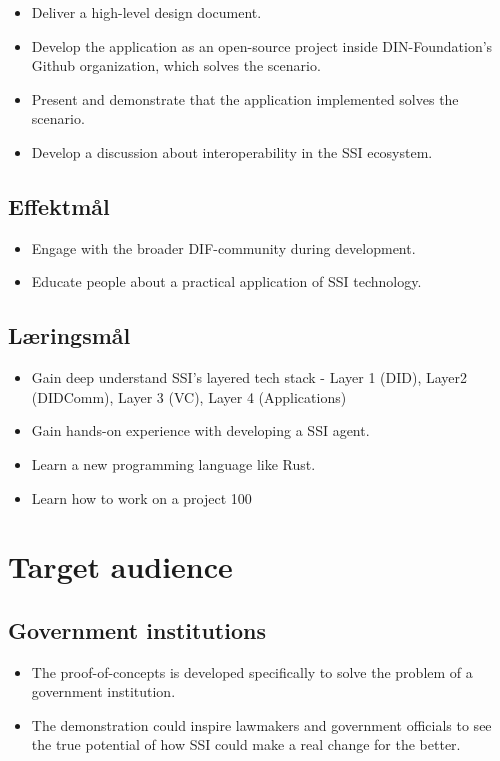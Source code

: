 \begin{itemize}
\item Deliver a high-level design document.
\item Develop the application as an open-source project inside DIN-Foundation's Github organization, which solves the scenario.
\item Present and demonstrate that the application implemented solves the scenario.
\item Develop a discussion about interoperability in the SSI ecosystem.
\end{itemize}

\subsection{Effektmål}

\begin{itemize}
\item Engage with the broader DIF-community during development.
\item Educate people about a practical application of SSI technology.
\end{itemize}

\subsection{Læringsmål}

\begin{itemize}
\item Gain deep understand SSI's layered tech stack - Layer 1 (DID), Layer2 (DIDComm), Layer 3 (VC), Layer 4 (Applications)
\item Gain hands-on experience with developing a SSI agent.
\item Learn a new programming language like Rust.
\item Learn how to work on a project 100%
\end{itemize}



\section{Target audience}

\subsection{Government institutions}

\begin{itemize}
\item The proof-of-concepts is developed specifically to solve the problem of a government institution.
\item The demonstration could inspire lawmakers and government officials to see the true potential of how SSI could make a real change for the better.
\end{itemize}

